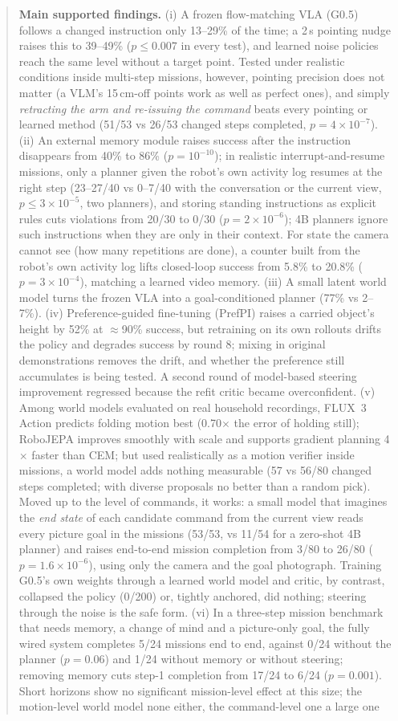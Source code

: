 \documentclass[10pt,a4paper]{article}
\begin{document}
\begin{abstract}
\textbf{Main supported findings.} (i) A frozen flow-matching VLA (G0.5) follows a changed instruction only 13--29\% of the time; a 2\,s pointing nudge raises this to 39--49\% ($p\le0.007$ in every test), and learned noise policies reach the same level without a target point. Tested under realistic conditions inside multi-step missions, however, pointing precision does not matter (a VLM's 15\,cm-off points work as well as perfect ones), and simply \emph{retracting the arm and re-issuing the command} beats every pointing or learned method (51/53 vs 26/53 changed steps completed, $p=4\times10^{-7}$). (ii) An external memory module raises success after the instruction disappears from 40\% to 86\% ($p=10^{-10}$); in realistic interrupt-and-resume missions, only a planner given the robot's own activity log resumes at the right step (23--27/40 vs 0--7/40 with the conversation or the current view, $p\le3\times10^{-5}$, two planners), and storing standing instructions as explicit rules cuts violations from 20/30 to 0/30 ($p=2\times10^{-6}$); 4B planners ignore such instructions when they are only in their context. For state the camera cannot see (how many repetitions are done), a counter built from the robot's own activity log lifts closed-loop success from 5.8\% to 20.8\% ($p=3\times10^{-4}$), matching a learned video memory. (iii) A small latent world model turns the frozen VLA into a goal-conditioned planner (77\% vs 2--7\%). (iv) Preference-guided fine-tuning (PrefPI) raises a carried object's height by 52\% at $\approx$90\% success, but retraining on its own rollouts drifts the policy and degrades success by round 8; mixing in original demonstrations removes the drift, and whether the preference still accumulates is being tested. A second round of model-based steering improvement regressed because the refit critic became overconfident. (v) Among world models evaluated on real household recordings, FLUX~3 Action predicts folding motion best (0.70$\times$ the error of holding still); RoboJEPA improves smoothly with scale and supports gradient planning 4$\times$ faster than CEM; but used realistically as a motion verifier inside missions, a world model adds nothing measurable (57 vs 56/80 changed steps completed; with diverse proposals no better than a random pick). Moved up to the level of commands, it works: a small model that imagines the \emph{end state} of each candidate command from the current view reads every picture goal in the missions (53/53, vs 11/54 for a zero-shot 4B planner) and raises end-to-end mission completion from 3/80 to 26/80 ($p=1.6\times10^{-6}$), using only the camera and the goal photograph. Training G0.5's own weights through a learned world model and critic, by contrast, collapsed the policy (0/200) or, tightly anchored, did nothing; steering through the noise is the safe form. (vi) In a three-step mission benchmark that needs memory, a change of mind and a picture-only goal, the fully wired system completes 5/24 missions end to end, against 0/24 without the planner ($p=0.06$) and 1/24 without memory or without steering; removing memory cuts step-1 completion from 17/24 to 6/24 ($p=0.001$). Short horizons show no significant mission-level effect at this size; the motion-level world model none either, the command-level one a large one 
\end{abstract}
\end{document}
